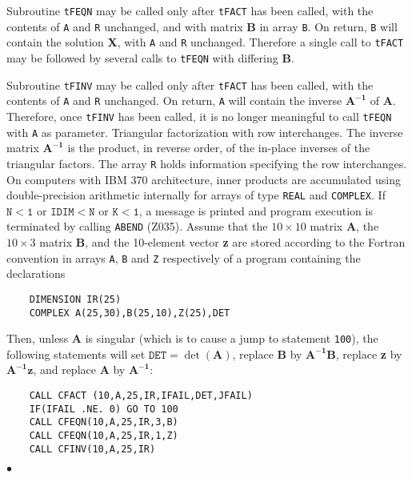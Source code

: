 Subroutine {\tt tFEQN} may be called only after {\tt tFACT} has been
called, with the contents of {\tt A} and {\tt R} unchanged, and with
matrix {\bf B} in array {\tt B}. On return, {\tt B} will contain
the solution {\bf X}, with {\tt A} and {\tt R} unchanged. Therefore a
single call to {\tt tFACT} may be followed by several calls to
{\tt tFEQN} with differing {\bf B}.
\par
Subroutine {\tt tFINV} may be called only after {\tt tFACT} has been
called, with the contents of {\tt A} and {\tt R} unchanged. On return,
{\tt A} will contain the inverse $\mathbf{A^{-1}}$ of {\bf A}. Therefore,
once {\tt tFINV} has been called, it is no longer meaningful to call
{\tt tFEQN} with {\tt A} as parameter.
\Method
Triangular factorization with row interchanges. The inverse
matrix $\mathbf{A^{-1}}$ is the product, in reverse order, of the
in-place inverses of the triangular factors. The array {\tt R} holds
information specifying the row interchanges.
\Accuracy
On computers with IBM 370 architecture, inner products are accumulated
using double-precision arithmetic internally for arrays of type
{\tt REAL} and {\tt COMPLEX}.
\Errorh
If $\mathtt{N < 1}$ or $\mathtt{IDIM < N}$ or $\mathtt{K < 1}$,
a message is printed and program execution is terminated by
calling {\tt ABEND} (Z035).
\Examples
Assume that the $10 \times 10$ matrix {\bf A}, the $10 \times 3$ matrix
{\bf B}, and the 10-element vector {\bf z} are stored according to
the Fortran convention in arrays {\tt A}, {\tt B} and {\tt Z}
respectively of a program containing the declarations
\begin{verbatim}
    DIMENSION IR(25)
    COMPLEX A(25,30),B(25,10),Z(25),DET
\end{verbatim}
Then, unless {\bf A} is singular (which is to cause a jump to
statement {\tt 100}), the following statements will set
$\mathtt{DET}=\det(\mathbf{A})$, replace {\bf B} by $\mathbf{A^{-1}B}$,
replace
{\bf z} by $\mathbf{A^{-1}z}$, and replace {\bf A} by  $\mathbf{A^{-1}}$:
\begin{verbatim}
    CALL CFACT (10,A,25,IR,IFAIL,DET,JFAIL)
    IF(IFAIL .NE. 0) GO TO 100
    CALL CFEQN(10,A,25,IR,3,B)
    CALL CFEQN(10,A,25,IR,1,Z)
    CALL CFINV(10,A,25,IR)
\end{verbatim}
$\bullet$
